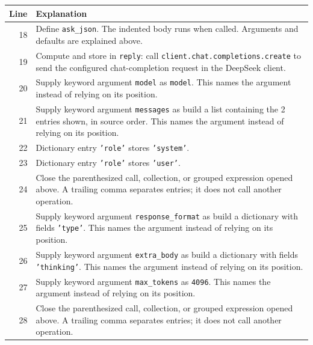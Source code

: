 \documentclass[11pt,a4paper]{book}
\begin{document}
\begin{longtable}{r p{}}

\textbf{Line} & \textbf{Explanation} \\ \hline \endhead

18 & Define \texttt{ask\_json}. The indented body runs when called. Arguments and defaults are explained above. \\

19 & Compute and store in \texttt{reply}: call \texttt{client.chat.completions.create} to send the configured chat-completion request in the DeepSeek client.  \\

20 & Supply keyword argument \texttt{model} as \texttt{model}. This names the argument instead of relying on its position. \\

21 & Supply keyword argument \texttt{messages} as build a list containing the 2 entries shown, in source order. This names the argument instead of relying on its position. \\

22 & Dictionary entry \texttt{'role'} stores \texttt{'system'}. \\

23 & Dictionary entry \texttt{'role'} stores \texttt{'user'}. \\

24 & Close the parenthesized call, collection, or grouped expression opened above. A trailing comma separates entries; it does not call another operation. \\

25 & Supply keyword argument \texttt{response\_format} as build a dictionary with fields \texttt{'type'}. This names the argument instead of relying on its position. \\

26 & Supply keyword argument \texttt{extra\_body} as build a dictionary with fields \texttt{'thinking'}. This names the argument instead of relying on its position. \\

27 & Supply keyword argument \texttt{max\_tokens} as \texttt{4096}. This names the argument instead of relying on its position. \\

28 & Close the parenthesized call, collection, or grouped expression opened above. A trailing comma separates entries; it does not call another operation. \\


\end{longtable}
\end{document}
